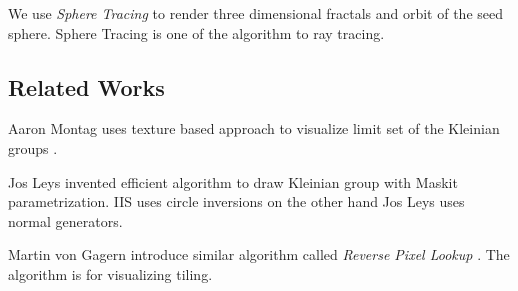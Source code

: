 We use \textit{Sphere Tracing} to render three dimensional
fractals and orbit of the seed sphere.
Sphere Tracing is one of the algorithm to ray tracing.

\subsection{Related Works}

Aaron Montag uses texture based approach to visualize limit set of the
Kleinian groups \cite{Montag2014hyperbolicIFS}.

Jos Leys invented efficient algorithm to draw Kleinian group with Maskit
parametrization. IIS uses circle inversions on the other hand Jos Leys
uses normal generators.

Martin von Gagern introduce similar algorithm called \textit{Reverse
Pixel Lookup} \cite{journals/combinatorics/GagernR09}. The algorithm is for visualizing tiling.